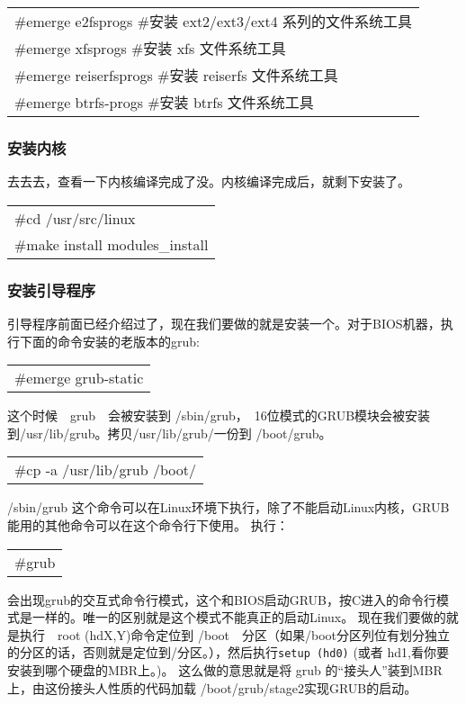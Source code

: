 \documentclass[amstex,twoside]{ctexbook}
\newenvironment{code}{\small\tt\begin{longtable}{p{0.8\textwidth}}}{\end{longtable}}
\begin{document}
\begin{code}
\#emerge e2fsprogs	\#安装 ext2/ext3/ext4 系列的文件系统工具\\
\#emerge xfsprogs	\#安装 xfs 文件系统工具\\
\#emerge reiserfsprogs	\#安装 reiserfs 文件系统工具\\
\#emerge btrfs-progs	\#安装 btrfs 文件系统工具\\
\end{code}

\subsubsection{安装内核}

去去去，查看一下内核编译完成了没。内核编译完成后，就剩下安装了。

\begin{code}
\#cd /usr/src/linux\\
\#make install modules\_install
\end{code}

\subsubsection{安装引导程序}

引导程序前面已经介绍过了，现在我们要做的就是安装一个。对于BIOS机器，执行下面的命令安装的老版本的grub:

\begin{code}
\#emerge grub-static
\end{code}

这个时候　grub　会被安装到 /sbin/grub，　16位模式的GRUB模块会被安装到/usr/lib/grub。拷贝/usr/lib/grub/一份到 /boot/grub。

\begin{code}
\#cp -a /usr/lib/grub /boot/
\end{code}

/sbin/grub 这个命令可以在Linux环境下执行，除了不能启动Linux内核，GRUB能用的其他命令可以在这个命令行下使用。
执行：
\begin{code}
\#grub
\end{code}

会出现grub的交互式命令行模式，这个和BIOS启动GRUB，按C进入的命令行模式是一样的。唯一的区别就是这个模式不能真正的启动Linux。
现在我们要做的就是执行　root (hdX,Y)命令定位到 /boot　分区（如果/boot分区列位有划分独立的分区的话，否则就是定位到/分区。），然后执行{\tt setup (hd0)} (或者 hd1,看你要安装到哪个硬盘的MBR上。)。
这么做的意思就是将 grub 的“接头人”装到MBR上，由这份接头人性质的代码加载 /boot/grub/stage2实现GRUB的启动。
\end{document}
